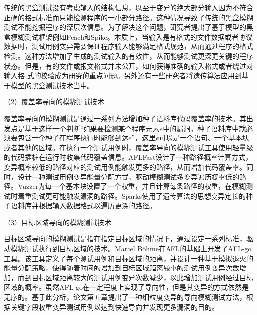 传统的黑盒测试没有考虑输入的结构信息，以至于变异的绝大部分输入因为不符合正确的格式标准而只能检测程序的一小部分路径。这种情况导致了传统的黑盒模糊测试不能挖掘程序的深层次信息。为了解决这个问题，研究者提出了基于模型的黑盒模糊测试框架例如Peach和Spike。本质上，当输入是有格式的文件数据或者协议数据时，测试用例变异需要保证程序输入能够满足格式规范，从而通过程序的格式检测。这种方法增加了生成的测试输入的有效性，从而能够测试更深更关键的程序状态。但是，有的文件或报文格式并未公开，如何获得准确的输入格式或者绕过对输入格
式的校验成为研究的重点问题。另外还有一些研究者将遗传算法应用到基于模型的黑盒测试技术当中。


（2）覆盖率导向的模糊测试技术

覆盖率导向的模糊测试是通过一系列方法增加种子语料库代码覆盖率的技术。其出发点是基于这样一个判断“如果要检测某个程序元素$e$中的漏洞，种子语料库中就必须要包含一个种子在程序执行时能够到达$e$”，这里$e$可以是一个语句、一个基本块或者其他的区域。在执行一个测试用例时，覆盖率导向的模糊测试工具使用轻量级的代码插桩在运行时收集代码覆盖信息。AFLFast设计了一种路径概率计算方式，变异概率较低的路径对应的测试用例能触发更多的路径，从而增加代码覆盖率。同时，设计一种测试用例变异能量分配方式，驱动模糊测试多变异遍历概率低的路径。Vuzzer为每一个基本块设置了一个权重，并且计算每条路径的权重，在模糊测试时着重测试更可能触发漏洞的路径。Sparks使用了遗传算法的思想变异定长的种子语料库并根据输入数据格式以遍历更深的路径。

（3）目标区域导向的模糊测试技术

目标区域导向的模糊测试是指在指定目标区域的情况下，通过设定一系列标准，驱动模糊测试执行到目标区域的技术。Marcel Böhme在AFL的基础上开发了AFL-go工具。该工具定义了每个测试用例和目标区域的距离，并设计一种基于模拟退火的能量分配策略，使得随着时间的增加到目标区域距离较小的测试用例变异次数增加，而到目标区域距离较大的测试用例变异次数减少，以此增加测试用例经过目标区域的概率。虽然AFL-go在一定程度上实现了导向性，但是其变异的方式依然是无序的。基于此分析，论文第五章提出了一种细粒度变异的导向模糊测试方法，根据关键字段权重变异测试用例以达到快速导向并发现更多漏洞的目的。

